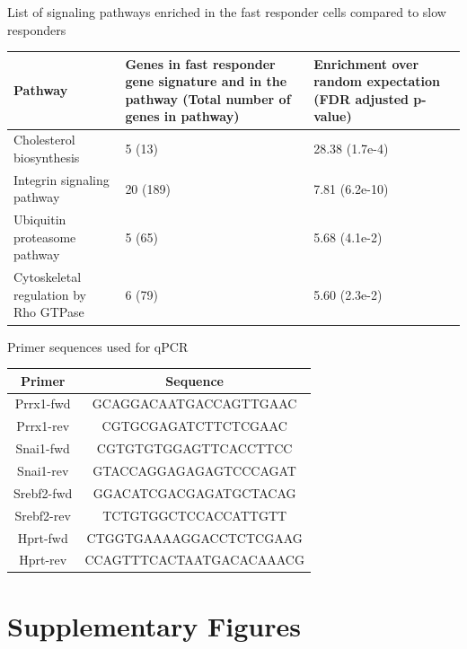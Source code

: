 \begin{supptable}[p]
\centering
\caption{List of signaling pathways enriched in the fast responder cells compared to slow responders}
\begin{tabular}{ p{3cm}p{3cm}p{3cm} }
\toprule
\textbf{Pathway} & \textbf{Genes in fast responder gene signature and in the pathway (Total number of genes in pathway)} & \textbf{Enrichment over random expectation (FDR adjusted p-value)} \\
\midrule
Cholesterol biosynthesis & 5 (13) & 28.38 (1.7e-4) \\
Integrin signaling pathway & 20 (189) & 7.81 (6.2e-10) \\
Ubiquitin proteasome pathway & 5 (65) & 5.68 (4.1e-2) \\
Cytoskeletal regulation by Rho GTPase & 6 (79) & 5.60 (2.3e-2) \\
\bottomrule
\end{tabular}
\label{tab:hedgehog_tableS2}
\end{supptable}


\begin{supptable}[p!]
\centering
\caption{Primer sequences used for qPCR}
\begin{tabular}{ cc }
\toprule
\textbf{Primer} & \textbf{Sequence} \\
\midrule
Prrx1-fwd & GCAGGACAATGACCAGTTGAAC \\
Prrx1-rev & CGTGCGAGATCTTCTCGAAC \\
Snai1-fwd & CGTGTGTGGAGTTCACCTTCC \\
Snai1-rev & GTACCAGGAGAGAGTCCCAGAT \\
Srebf2-fwd & GGACATCGACGAGATGCTACAG \\
Srebf2-rev & TCTGTGGCTCCACCATTGTT \\
Hprt-fwd & CTGGTGAAAAGGACCTCTCGAAG \\
Hprt-rev & CCAGTTTCACTAATGACACAAACG \\
\bottomrule
\end{tabular}
\label{tab:hedgehog_tableS3}
\end{supptable}

\clearpage
\section{Supplementary Figures}

